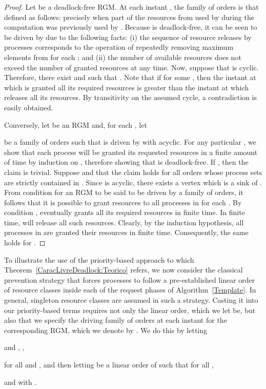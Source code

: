 \documentclass{article}
\begin{document}
\begin{proof}
Let  be a deadlock-free RGM. At each instant , the
family of orders
 is
that defined as follows:  precisely when part of the resources
from  used by  during the computation was previously used by .
Because  is deadlock-free, it can be seen to be driven by
 due to the following facts: (i) the sequence of resource
releases by processes corresponds to the operation of repeatedly removing
maximum elements from  for each
; and (ii) the number of available resources does not
exceed the number of granted resources at any time. Now, suppose that
 is cyclic. Therefore, there exist  and
 such that
.
Note that if  for some , then the instant at
which  is granted all its required resources is greater than the instant at
which  releases all its resources. By transitivity on the assumed cycle, a
contradiction is easily obtained.

Conversely, let  be an RGM and, for each , let

be a family of orders such that  is driven by  with
 acyclic. For any particular , we show that
each process will be granted its requested resources in a finite amount of time
by induction on , therefore showing that  is
deadlock-free. If , then the claim is trivial. Suppose
 and that the claim holds for all orders whose process sets
are strictly contained in . Since  is acyclic,
there exists a vertex  which is a sink of . From condition
 for an RGM to be said to be driven by a family of orders, it follows that it
is possible to grant resources to all processes in
 for each . By condition
,  eventually grants  all its required resources in finite
time. In finite time,  will release all such resources. Clearly, by the
induction hypothesis, all processes in  are granted
their resources in finite time. Consequently, the same holds for
.
\end{proof}

To illustrate the use of the priority-based approach to which
Theorem~\ref{CaracLivreDeadlock:Teorico} refers, we now consider the classical
prevention strategy that forces processes to follow a pre-established linear
order of resource classes inside each of the request phases of
Algorithm~\ref{Template}. In general, singleton resource classes are assumed in
such a strategy. Casting it into our priority-based terms requires not only the
linear order, which we let  be, but also that
we specify the driving family of orders
 at
each instant  for the corresponding RGM, which we denote by
. We do this by letting
\begin{center}
	 and , ,
\end{center}
for all  and , and then letting
 be a linear order of  such that for all
,
\begin{center}
	 and  with .
\end{center}
\end{document}
